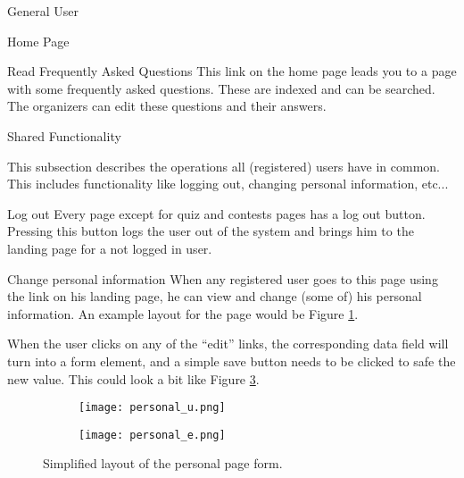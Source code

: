 \begin{section}{General User}
\begin{subsection}{Home Page}
        \begin{subsubsection}{Read Frequently Asked Questions}
            This link on the home page leads you to a page with some frequently
            asked questions. These are indexed and can be searched. The
            organizers can edit these questions and their answers.
        \end{subsubsection}

    \end{subsection}

    \begin{subsection}{Shared Functionality}

        This subsection describes the operations all (registered) users have in
        common. This includes functionality like logging out, changing personal
        information, etc...

        \begin{subsubsection}{Log out}
            Every page except for quiz and contests pages has a log out button.
            Pressing this button logs the user out of the system and brings him
            to the landing page for a not logged in user.
        \end{subsubsection}

        \begin{subsubsection}{Change personal information}
            When any registered user goes to this page using the link on his
            landing page, he can view and change (some of) his personal
            information. An example layout for the page would be Figure
            \ref{img:personal}.

            When the user clicks on any of the ``edit'' links, the corresponding
            data field will turn into a form element, and a simple save button
            needs to be clicked to safe the new value. This could look a bit
            like Figure \ref{img:personal_edit}.

            \begin{figure}
                \centering
                \begin{subfigure}{0.3\textwidth}
                    \texttt{[image: personal\_u.png]}
                    \label{img:personal}
                \end{subfigure}

                \begin{subfigure}{0.3\textwidth}
                    \texttt{[image: personal\_e.png]}
                    \label{img:personal_edit}
                \end{subfigure}
                \caption{Simplified layout of the personal page form.}
            \end{figure}
        \end{subsubsection}


\end{subsection}
\end{section}
